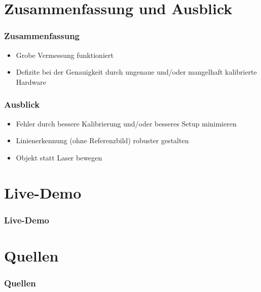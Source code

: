 \documentclass[xcolor=dvipsnames]{beamer}
\begin{document}

\section{Zusammenfassung und Ausblick}
\begin{frame}
	\frametitle{Zusammenfassung}

	\begin{itemize}
		\item Grobe Vermessung funktioniert
		\item Defizite bei der Genauigkeit durch ungenaue und/oder mangelhaft kalibrierte Hardware
	\end{itemize}

\end{frame}


\begin{frame}
	\frametitle{Ausblick}

	\begin{itemize}
		\item Fehler durch bessere Kalibrierung und/oder besseres Setup minimieren
		\item Linienerkennung (ohne Referenzbild) robuster gestalten
		\item Objekt statt Laser bewegen
	\end{itemize}

\end{frame}


\section{Live-Demo} 
\begin{frame}
	\frametitle{Live-Demo}
\end{frame}


\section{Quellen} 
\begin{frame}
	\frametitle{Quellen}

\end{frame}
\end{document}
